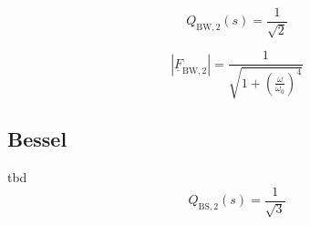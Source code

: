 \documentclass{article}[11pt]
\begin{document}
\begin{equation}
Q_{\mathrm{BW,2}}(s) = \frac{1}{\sqrt{2}}
\end{equation}

\begin{equation}
\left|\underline{F}_{\mathrm{BW,2}}\right|
                 = \frac{1}{\sqrt{1+\left(\frac{\omega}{\omega_0}\right)^4}}
\end{equation}

\subsection{Bessel}
tbd
\begin{equation}
Q_{\mathrm{BS,2}}(s) = \frac{1}{\sqrt{3}}
\end{equation}


\printbibliography
\end{document}
